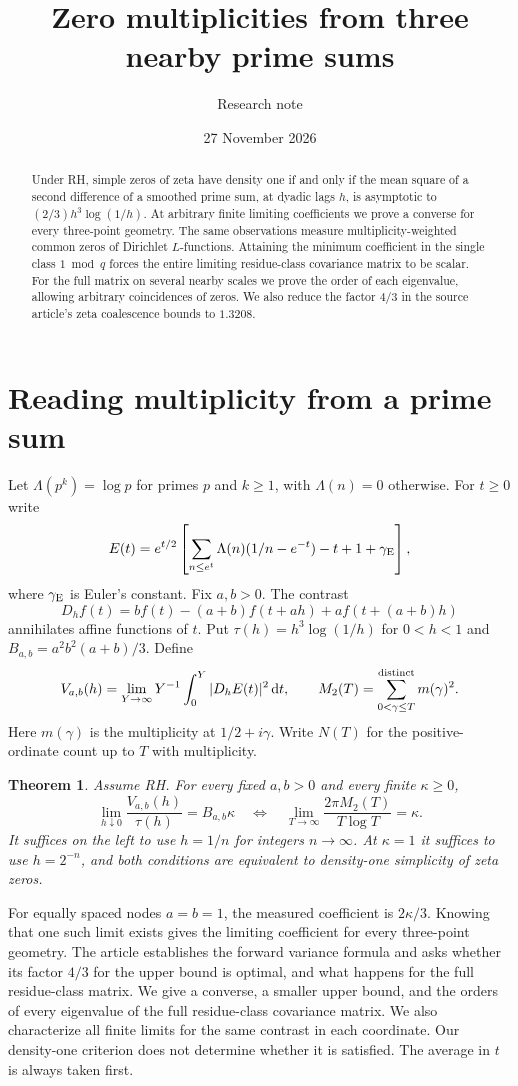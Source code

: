 \documentclass[11pt]{article}
\title{Zero multiplicities from three nearby prime sums}
\author{Research note}
\date{27 November 2026}
\newtheorem{theorem}{Theorem}[section]
\newcommand{\dd}{\,\mathrm d}
\begin{document}
\maketitle
\begin{abstract}
Under RH, simple zeros of zeta have density one if and only if the mean square of a second difference of a smoothed prime sum, at dyadic lags $h$, is asymptotic to $(2/3)h^3\log(1/h)$. At arbitrary finite limiting coefficients we prove a converse for every three-point geometry. The same observations measure multiplicity-weighted common zeros of Dirichlet $L$-functions. Attaining the minimum coefficient in the single class $1\bmod q$ forces the entire limiting residue-class covariance matrix to be scalar. For the full matrix on several nearby scales we prove the order of each eigenvalue, allowing arbitrary coincidences of zeros. We also reduce the factor $4/3$ in the source article's zeta coalescence bounds to $1.3208$.
\end{abstract}

\section{Reading multiplicity from a prime sum}
Let $\Lambda(p^k)=\log p$ for primes $p$ and $k\ge1$, with $\Lambda(n)=0$ otherwise. For $t\ge0$ write
\[
 E(t)=e^{t/2}\left[\sum_{n\le e^t}\Lambda(n)(1/n-e^{-t})-t+1+\gamma_{\rm E}\right],
\]
where $\gamma_{\rm E}$ is Euler's constant. Fix $a,b>0$. The contrast
\[
 D_h f(t)=b f(t)-(a+b)f(t+ah)+a f(t+(a+b)h)
\]
annihilates affine functions of $t$. Put $\tau(h)=h^3\log(1/h)$ for $0<h<1$ and $B_{a,b}=a^2b^2(a+b)/3$. Define
\[
 V_{a,b}(h)=\lim_{Y\to\infty}Y^{-1}\int_0^Y |D_hE(t)|^2\dd t,
 \qquad M_2(T)=\sum_{0<\gamma\le T}^{\rm distinct}m(\gamma)^2 .
\]
Here $m(\gamma)$ is the multiplicity at $1/2+i\gamma$. Write $N(T)$ for the positive-ordinate count up to $T$ with multiplicity.

\begin{theorem}\label{th:zeta}
Assume RH. For every fixed $a,b>0$ and every finite $\kappa\ge0$,
\[
 \lim_{h\downarrow0}\frac{V_{a,b}(h)}{\tau(h)}=B_{a,b}\kappa
 \quad\Longleftrightarrow\quad
 \lim_{T\to\infty}\frac{2\pi M_2(T)}{T\log T}=\kappa .
\]
It suffices on the left to use $h=1/n$ for integers $n\to\infty$. At $\kappa=1$ it suffices to use $h=2^{-n}$, and both conditions are equivalent to density-one simplicity of zeta zeros.
\end{theorem}

For equally spaced nodes $a=b=1$, the measured coefficient is $2\kappa/3$. Knowing that one such limit exists gives the limiting coefficient for every three-point geometry. The article \cite{repo} establishes the forward variance formula and asks whether its factor $4/3$ for the upper bound is optimal, and what happens for the full residue-class matrix. We give a converse, a smaller upper bound, and the orders of every eigenvalue of the full residue-class covariance matrix. We also characterize all finite limits for the same contrast in each coordinate. Our density-one criterion does not determine whether it is satisfied. The average in $t$ is always taken first.
\end{document}
